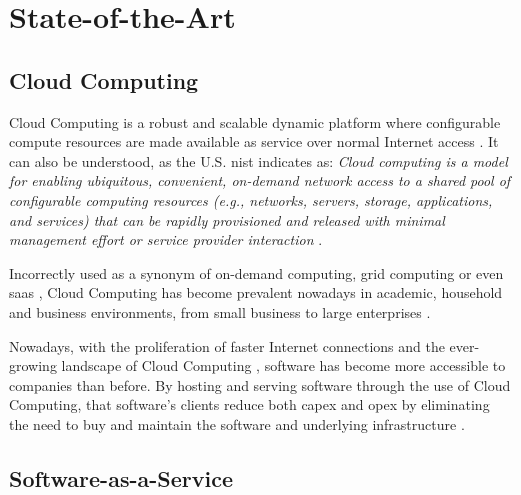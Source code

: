 \chapter{State-of-the-Art}\label{state-of-the-art}

\section{Cloud Computing}\label{state-of-the-art:s:cloud-computing}

Cloud Computing is a robust and scalable dynamic platform where configurable compute resources are made available as service over normal Internet access \Parencite{alnumay_2020}.
It can also be understood, as the U.S. \gls{nist} indicates as:
\textit{Cloud computing is a model for enabling ubiquitous, convenient, on-demand network access to a shared pool of configurable computing resources (e.g., networks, servers, storage, applications, and services) that can be rapidly provisioned and released with minimal management effort or service provider interaction} \Parencite{mell_grance_2011}. 

Incorrectly used as a synonym of on-demand computing, grid computing or even \gls{saas} \Parencite{kim_2009}, Cloud Computing has become prevalent nowadays in academic, household and business environments, from small business to large enterprises \parencite{rezaei_chiew_lee_shams_aliee_2014}.

Nowadays, with the proliferation of faster Internet connections and the ever-growing landscape of Cloud Computing
\Parencite{dillon_tharam_and_wu_chen_and_chang_elizabeth}, software has become more accessible to companies than before.
By hosting and serving software through the use of Cloud Computing, that software's clients reduce both \gls{capex} and \gls{opex} by eliminating the need to buy and maintain the software and underlying infrastructure \Parencite{alnumay_2020}.

\section{Software-as-a-Service}\label{state-of-the-art:s:software-as-a-service}

